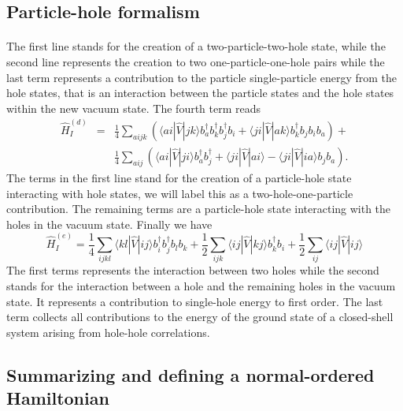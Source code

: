 \documentclass[%
twoside,                 %
final,                   %
10pt]{article}
\begin{document}
\subsection{Particle-hole formalism}

\paragraph{}
The first line stands for the creation of a two-particle-two-hole state, while the second line represents
the creation to two one-particle-one-hole pairs
while the last term represents a contribution to the particle single-particle energy
from the hole states, that is an interaction between the particle states and the hole states
within the new vacuum  state.
The fourth term reads
\begin{eqnarray}
	 \hat{H}_I^{(d)}& = &\frac{1}{4} 
	 	\sum_{aijk}\left(\langle ai|\hat{V}|jk\rangle b_a^\dagger b_k^\dagger b_j^\dagger b_i+
\langle ji|\hat{V}|ak\rangle b_k^\dagger b_j b_i b_a\right)+\nonumber \\
&&\frac{1}{4}\sum_{aij}\left(\langle ai|\hat{V}|ji\rangle b_a^\dagger b_j^\dagger+
\langle ji|\hat{V}|ai\rangle - \langle ji|\hat{V}|ia\rangle b_j b_a \right). \label{eq:2-69d} 
\end{eqnarray}
The terms in the first line  stand for the creation of a particle-hole state 
interacting with hole states, we will label this as a two-hole-one-particle contribution. 
The remaining terms are a particle-hole state interacting with the holes in the vacuum state. 
Finally we have 
\begin{equation}
	\hat{H}_I^{(e)} = \frac{1}{4}
		 \sum_{ijkl}
		 \langle kl|\hat{V}|ij\rangle b_i^\dagger b_j^\dagger b_l b_k+
	        \frac{1}{2}\sum_{ijk}\langle ij|\hat{V}|kj\rangle b_k^\dagger b_i
	        +\frac{1}{2}\sum_{ij}\langle ij|\hat{V}|ij\rangle \label{eq:2-70d}
\end{equation}
The first terms represents the 
interaction between two holes while the second stands for the interaction between a hole and the remaining holes in the vacuum state.
It represents a contribution to single-hole energy  to first order.
The last term collects all contributions to the energy of the ground state of a closed-shell system arising
from hole-hole correlations.




\subsection{Summarizing and defining a normal-ordered Hamiltonian}
\end{document}
